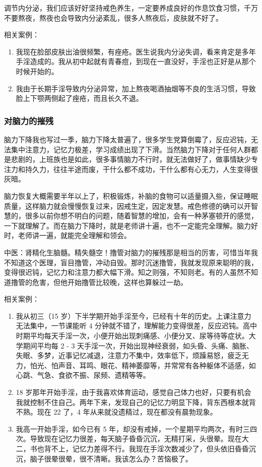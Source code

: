 \documentclass[fontset=founder]{ctexart}
\begin{document}
调节内分泌，我们应该好好坚持戒色养生，一定要养成良好的作息饮食习惯，千万不要熬夜，熬夜也会导致内分泌紊乱，很多人熬夜后，皮肤就不好了。

相关案例：

\begin{enumerate}
    \item 我现在脸部皮肤出油很频繁，有痤疮。医生说我内分泌失调，看来肯定是多年手淫造成的。我从初中起就有青春痘，到现在一直没好，手淫也正好是从那个时候开始的。
    \item 我由于长期手淫导致内分泌异常，加上熬夜喝酒抽烟等不良的生活习惯，导致脸上下颚两侧起了痤疮，而且长久不退。
\end{enumerate}

\subsubsection{对脑力的摧残}

脑力下降我也写过一季，脑力下降太普遍了，很多学生党算倒霉了，反应迟钝，无法集中注意力，记忆力极差，学习成绩出现了下滑。当然脑力下降对于任何人群都是悲剧的，上班族也是如此，很多事情脑力不行时，就无法做好了，做事情缺少专注力和持久力，往往半途而废，干什么都不成功，干什么都有心无力，人生变得很灰暗。

脑力恢复大概需要半年以上了，积极锻炼，补脑的食物可以适量摄入些，保证睡眠质量，这样脑力就会慢慢恢复过来，因戒生定，因定发慧。戒色修德的确可以开智慧的，很多以前你想不明白的问题，随着智慧的增加，会有一种茅塞顿开的感觉，一下就理解了。而在脑力下降时，就是老师讲十遍，也不一定能完全理解。脑力好时，老师讲一遍，就能完全理解和领会。

中医：肾精化生脑髓。精失髓空！撸管对脑力的摧残那是相当的厉害，可惜当年我不知道这个医理，盲目撸管，冲动自毁。那时沉迷撸管，我就发现原来聪明的我，变得很迟钝，记忆力和注意力都大幅下滑。知之则强，不知则老。有的人虽然不知道撸管的危害，但他开始撸管比较晚，这样也算躲过一劫。

相关案例：

\begin{enumerate}
    \item 我从初三（15 岁）下半学期开始手淫至今，已经有十年的历史。上课注意力无法集中，一节课能听 4 分钟就不错了，理解能力变得很差，反应迟钝。高中时期平均每天手淫一次，小便开始出现刺痛感、小便分叉、尿等待等症状。大学期间平均每 2 - 3 天手淫一次，开始出现神经衰弱，如头昏、头痛、脑胀、失眠、多梦，近事记忆减退，注意力不集中，效率低下，烦躁易怒，疲乏无力，怕光、怕声音、耳鸣、眼花、精神萎靡等，并常常有各种躯体不适感，如心跳、气急、食欲不振、尿频、遗精等等。
    \item 18 岁那年开始手淫，由于我喜欢体育运动，感觉自己体力也好，只要有机会我就控制不住自己。两年下来，发现自己的记忆力明显下降，背东西根本就背不熟。现在 22 了，4 年从来就没遗精过，现在都没有晨勃现象。
    \item 我高一开始手淫，如今已有 5 年，却没有戒掉，一个星期平均两次，有时三四次。导致现在记忆力很差，每天脑子昏昏沉沉，无精打采，头很晕。现在大二，书也背不上，记忆力差得不行。我现在手淫次数减少了，但头依旧昏昏沉沉，脑子很晕很晕，很不清晰。我该怎么办？苦恼极了。
\end{enumerate}
\end{document}
